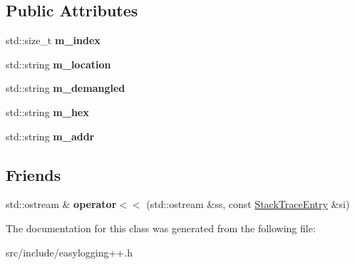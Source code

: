 \subsection*{Public Attributes}
\begin{DoxyCompactItemize}
\item 
\mbox{\label{classel_1_1base_1_1debug_1_1_stack_trace_1_1_stack_trace_entry_a8361364e2cbb728a2e2a17db8b308842}} 
std\+::size\+\_\+t {\bfseries m\+\_\+index}
\item 
\mbox{\label{classel_1_1base_1_1debug_1_1_stack_trace_1_1_stack_trace_entry_aaf6f6c49736d5c10b2047dde6eef4a38}} 
std\+::string {\bfseries m\+\_\+location}
\item 
\mbox{\label{classel_1_1base_1_1debug_1_1_stack_trace_1_1_stack_trace_entry_a7ca2c3d08ea6fbef5b605041500c7d47}} 
std\+::string {\bfseries m\+\_\+demangled}
\item 
\mbox{\label{classel_1_1base_1_1debug_1_1_stack_trace_1_1_stack_trace_entry_af4d5ffabfe8bbffb5eedcdd95b4eebfe}} 
std\+::string {\bfseries m\+\_\+hex}
\item 
\mbox{\label{classel_1_1base_1_1debug_1_1_stack_trace_1_1_stack_trace_entry_a11b23a57f14add4b825d97bb1d58e6f2}} 
std\+::string {\bfseries m\+\_\+addr}
\end{DoxyCompactItemize}
\subsection*{Friends}
\begin{DoxyCompactItemize}
\item 
\mbox{\label{classel_1_1base_1_1debug_1_1_stack_trace_1_1_stack_trace_entry_ae393cfa1f102a32239d485892c659862}} 
std\+::ostream \& {\bfseries operator$<$$<$} (std\+::ostream \&ss, const \hyperlink{classel_1_1base_1_1debug_1_1_stack_trace_1_1_stack_trace_entry}{Stack\+Trace\+Entry} \&si)
\end{DoxyCompactItemize}


The documentation for this class was generated from the following file\+:\begin{DoxyCompactItemize}
\item 
src/include/easylogging++.\+h\end{DoxyCompactItemize}

